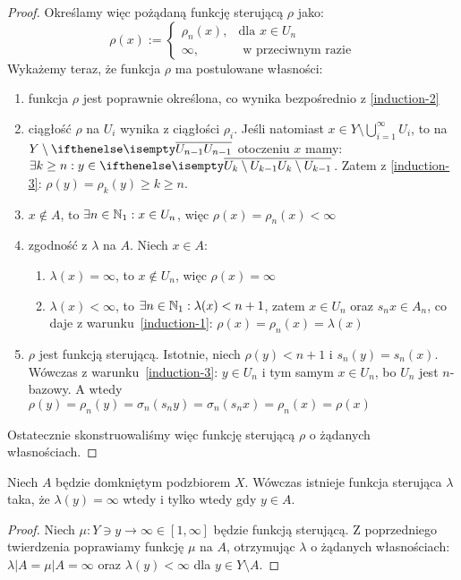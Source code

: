 \begin{thm}
\begin{proof}
  Określamy więc pożądaną funkcję sterującą $\rho$ jako:
  \[\rho(x) := 
    \begin{cases}
      \rho_n(x),&\mbox{dla } x \in U_n \\
      \infty,&\mbox{ w przeciwnym razie}
    \end{cases}
  \]
  Wykażemy teraz, że funkcja $\rho$ ma postulowane własności:
  \begin{enumerate}
   \item funkcja $\rho$ jest poprawnie określona, co wynika bezpośrednio z \ref{induction-2}
   \item ciągłość $\rho$ na $U_i$ wynika z ciągłości $\rho_i$. Jeśli natomiast $x\in Y\setminus\bigcup_{i=1}^\infty U_i$, to na $Y\setminus\cl{U_{n-1}}$ otoczeniu $x$ mamy: $\exists k\geq n: y\in \cl{U_{k} \setminus U_{k-1}}$. Zatem z \ref{induction-3}: $\rho(y) = \rho_k(y) \geq k \geq n$.
   \item $x\not\in A$, to $\exists n\in{\mathbb{N}_1}: x\in U_n$, więc $\rho(x) = \rho_n(x) < \infty$
   \item zgodność z $\lambda$ na $A$. Niech $x\in A$:
   \begin{enumerate}[1$^\circ$]
    \item $\lambda(x) = \infty$, to $x\not\in U_n$, więc $\rho(x) = \infty$
    \item $\lambda(x) < \infty$, to $\exists n\in{\mathbb{N}_1}: \lambda(x) < n+1$, zatem $x \in U_n$ oraz $s_n x\in A_n$, co daje z warunku~\ref{induction-1}: $\rho(x) = \rho_n(x) = \lambda(x)$
   \end{enumerate}
   \item $\rho$ jest funkcją sterującą. Istotnie, niech $\rho(y) < n+1$ i $s_n(y) = s_n(x)$. Wówczas z warunku~\ref{induction-3}: $y \in U_n$ i tym samym $x \in U_n$, bo $U_n$ jest $n$-bazowy. A wtedy $\rho(y) = \rho_n(y) = \sigma_n(s_n y) = \sigma_n(s_n x) = \rho_n(x) = \rho(x)$
  \end{enumerate}
  
  Ostatecznie skonstruowaliśmy więc funkcję sterującą $\rho$ o żądanych własnościach.
\end{proof}
\end{thm}


\begin{cor} \label{cor:steering-finite}
  Niech $A$ będzie domkniętym podzbiorem $X$. Wówczas istnieje funkcja sterująca $\lambda$ taka, że $\lambda(y) = \infty$ wtedy i tylko wtedy gdy $y \in A$.
  
  \begin{proof}
    Niech $\mu: Y \ni y \rightarrow \infty \in [1, \infty]$ będzie funkcją sterującą. Z poprzedniego twierdzenia poprawiamy funkcję $\mu$ na $A$, otrzymując $\lambda$ o żądanych własnościach: $\lambda|A = \mu|A = \infty$ oraz $\lambda(y) < \infty$ dla $y \in Y \setminus A$.
  \end{proof}
\end{cor}

